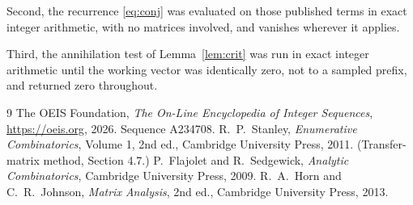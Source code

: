 \documentclass[11pt,a4paper]{article}
\theoremstyle{plain}
\theoremstyle{definition}
\begin{document}
Second, the recurrence \eqref{eq:conj} was evaluated on those published terms in exact
integer arithmetic, with no matrices involved, and vanishes wherever it applies.

Third, the annihilation test of Lemma~\ref{lem:crit} was run in exact integer arithmetic
until the working vector was identically zero, not to a sampled prefix, and returned zero
throughout.

\begin{thebibliography}{9}
 The OEIS Foundation, \emph{The On-Line Encyclopedia of Integer
Sequences}, \url{https://oeis.org}, 2026. Sequence A234708.
 R.~P.~Stanley, \emph{Enumerative Combinatorics}, Volume 1, 2nd ed.,
Cambridge University Press, 2011. (Transfer-matrix method, Section 4.7.)
 P.~Flajolet and R.~Sedgewick, \emph{Analytic Combinatorics}, Cambridge
University Press, 2009.
 R.~A.~Horn and C.~R.~Johnson, \emph{Matrix Analysis}, 2nd ed., Cambridge
University Press, 2013.
\end{thebibliography}
\end{document}
